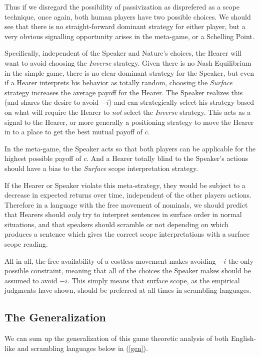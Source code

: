 \documentclass{article}
\begin{document}
Thus if we disregard the possibility of passivization as disprefered as a scope technique, once again, both human players have two possible choices.
We should see that there is no straight-forward dominant strategy for either player, but a very obvious signalling opportunity arises in the meta-game, or a Schelling Point.

Specifically, independent of the Speaker and Nature's choices, the Hearer will want to avoid choosing the \emph{Inverse} strategy.
Given there is no Nash Equilibrium in the simple game, there is no clear dominant strategy for the Speaker, but even if a Hearer interprets his behavior as totally random, choosing the \emph{Surface} strategy increases the average payoff for the Hearer.
The Speaker realizes this (and shares the desire to avoid $-i$) and can strategically select his strategy based on what will require the Hearer to \emph{not} select the \emph{Inverse} strategy.
This acts as a signal to the Hearer, or more generally a positioning strategy to move the Hearer in to a place to get the best mutual payoff of $c$.

In the meta-game, the Speaker acts so that both players can be applicable for the highest possible payoff of $c$.
And a Hearer totally blind to the Speaker's actions should have a bias to the \emph{Surface} scope interpretation strategy.

If the Hearer or Speaker violate this meta-strategy, they would be subject to a decrease in expected returns over time, independent of the other players actions.
Therefore in a language with the free movement of nominals, we should predict that Hearers should \emph{only} try to interpret sentences in surface order in normal situations, and that speakers should scramble or not depending on which produces a sentence which gives the correct scope interpretations with a surface scope reading.

All in all, the free availability of a costless movement makes avoiding $-i$ the only possible constraint, meaning that all of the choices the Speaker makes should be assumed to avoid $-i$.
This simply means that surface scope, as the empirical judgments have shown, should be preferred at all times in scrambling languages.

\subsection{The Generalization}

We can sum up the generalization of this game theoretic analysis of both English-like and scrambling languages below in (\ref{gen}).
\end{document}

